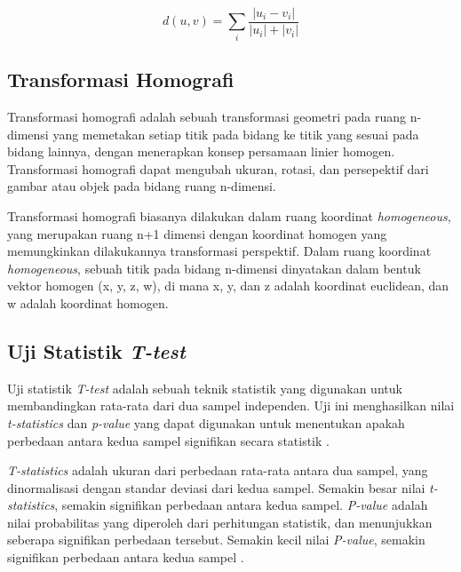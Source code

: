 \begin{equation}
	d(u,v) = \sum_i\frac{\left | u_i-v_i \right |}{\left | u_i \right |+\left | v_i \right |}
\end{equation}

\subsection{Transformasi Homografi}
Transformasi homografi adalah sebuah transformasi geometri pada ruang n-dimensi yang memetakan setiap titik pada bidang ke titik yang sesuai pada bidang
lainnya, dengan menerapkan konsep persamaan linier homogen. Transformasi homografi dapat mengubah ukuran, rotasi, dan persepektif dari gambar atau objek pada
bidang ruang n-dimensi.

Transformasi homografi biasanya dilakukan dalam ruang koordinat \emph{homogeneous}, yang merupakan ruang n+1 dimensi dengan koordinat homogen yang memungkinkan
dilakukannya transformasi perspektif. Dalam ruang koordinat \emph{homogeneous}, sebuah titik pada bidang n-dimensi dinyatakan dalam bentuk vektor homogen (x,
y, z, w), di mana x, y, dan z adalah koordinat euclidean, dan w adalah koordinat homogen. 


\subsection{Uji Statistik \emph{T-test}}
Uji statistik \emph{T-test} adalah sebuah teknik statistik yang digunakan untuk membandingkan rata-rata dari dua sampel independen. Uji ini menghasilkan nilai \emph{t-statistics} dan \emph{p-value} yang dapat digunakan untuk menentukan apakah perbedaan antara kedua sampel signifikan secara statistik \cite{kumar}.

\emph{T-statistics} adalah ukuran dari perbedaan rata-rata antara dua sampel, yang dinormalisasi dengan standar deviasi dari kedua sampel. Semakin besar nilai \emph{t-statistics}, semakin signifikan perbedaan antara kedua sampel. \emph{P-value} adalah nilai probabilitas yang diperoleh dari perhitungan statistik, dan menunjukkan seberapa signifikan perbedaan tersebut. Semakin kecil nilai \emph{P-value}, semakin signifikan perbedaan antara kedua sampel \cite{kumar}.

